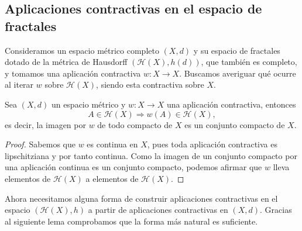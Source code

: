 \subsection{Aplicaciones contractivas en el espacio de fractales}

Consideramos un espacio métrico completo $(X,d)$ y su espacio de fractales dotado de la métrica de Hausdorff $(\mathcal H(X), h(d))$, que también es completo, y tomamos una aplicación contractiva $w:X\longrightarrow X$. Buscamos averiguar qué ocurre al iterar $w$ sobre $\mathcal{H}(X)$, siendo esta contractiva sobre $X$. 

\begin{lema}
    \label{lema:contractivas-compactos}
    Sea $(X,d)$ un espacio métrico y $w:X\longrightarrow X$ una aplicación contractiva, entonces 
    $$A\in\mathcal{H}(X)\Rightarrow w(A)\in\mathcal{H}(X),$$
    es decir, la imagen por $w$ de todo compacto de $X$ es un conjunto compacto de $X$.
\end{lema}
\begin{proof}
    Sabemos que $w$ es continua en $X$, pues toda aplicación contractiva es lipschitziana y por tanto continua. Como la imagen de un conjunto compacto por una aplicación continua es un conjunto compacto, podemos afirmar que $w$ lleva elementos de $\mathcal{H}(X)$ a elementos de $\mathcal{H}(X)$.
\end{proof}

Ahora necesitamos alguna forma de construir aplicaciones contractivas en el espacio $(\mathcal{H}(X),h)$ a partir de aplicaciones contractivas en $(X,d)$. Gracias al siguiente lema comprobamos que la forma más natural es suficiente.

